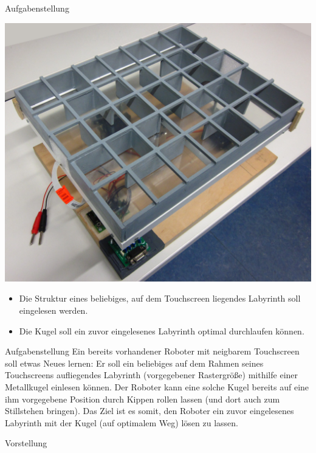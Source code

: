\documentclass{beamer}
\begin{document}
\begin{frame}[fragile,t]{Aufgabenstellung}
\begin{center}
\includegraphics[scale=.12]{roboter_badly-photoshoped}
\end{center}
\begin{itemize}[<+->]
\item Die Struktur eines beliebiges, auf dem Touchscreen liegendes Labyrinth soll eingelesen werden.
\item Die Kugel soll ein zuvor eingelesenes Labyrinth optimal durchlaufen können.
\end{itemize}
\end{frame}

\iffalse
\begin{frame}[fragile,t]{Aufgabenstellung}
Ein bereits vorhandener Roboter mit neigbarem Touchscreen soll etwas Neues lernen: Er soll ein beliebiges auf dem Rahmen seines Touchscreens aufliegendes Labyrinth (vorgegebener Rastergröße) mithilfe einer Metallkugel einlesen können. Der Roboter kann eine solche Kugel bereits auf eine ihm vorgegebene Position durch Kippen rollen lassen (und dort auch zum Stillstehen bringen). Das Ziel ist es somit, den Roboter ein zuvor eingelesenes Labyrinth mit der Kugel (auf optimalem Weg) lösen zu lassen.

\medskip\noindent
{}
\end{frame}

\begin{frame}[fragile,t]{Vorstellung}
\end{frame}
\end{document}
